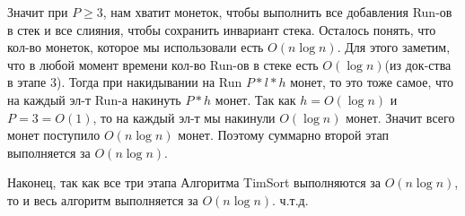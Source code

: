 \documentclass[12pt]{article}
\begin{document}
Значит при $P\geqslant3$, нам хватит монеток, чтобы выполнить все добавления Run-ов в стек и 
все слияния, чтобы сохранить инвариант стека.
Осталось понять, что кол-во монеток, которое мы использовали есть $O(n\log n)$. 
Для этого заметим, что в любой момент времени кол-во Run-ов в стеке есть $O(\log n)$(из док-ства в этапе 3).
Тогда при накидывании на Run $P*l*h$ монет, то это тоже самое, что на каждый эл-т Run-а накинуть $P*h$ монет.
Так как $h = O(\log n)$ и $P = 3 = O(1)$, то на каждый эл-т мы накинули $O(\log n)$ монет. 
Значит всего монет поступило $O(n\log n)$ монет. 
Поэтому суммарно второй этап выполняется за $O(n\log n)$.

Наконец, так как все три этапа Алгоритма TimSort выполняются за $O(n\log n)$, 
то и весь алгоритм выполняется за $O(n\log n)$. ч.т.д.
\end{document}

